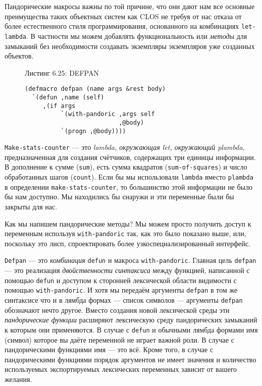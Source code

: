 Пандорические макросы важны по той причине, что они дают нам все основные преимущества таких объектных систем как CLOS не требуя от нас отказа от более естественного стиля программирования, основанного на комбинациях \verb"let-lambda". В частности мы можем добавлять функциональность или \emph{методы} для замыканий без необходимости создавать экземпляры экземпляров уже созданных объектов.

\begin{figure}Листинг 6.25: DEFPAN\label{listing_6.25}
\listbegin
\begin{verbatim}
(defmacro defpan (name args &rest body)
  `(defun ,name (self)
     ,(if args
          `(with-pandoric ,args self
                          ,@body)
          `(progn ,@body))))
\end{verbatim}
\listend
\end{figure}

\verb"Make-stats-counter" --- это \emph{lambda, окружающая let, окружающий {p\-lamb\-da}}, предназначенная для создания счётчиков, содержащих три единицы информации. В дополнение к сумме (\verb"sum"), есть сумма квадратов (\verb"sum-of-squares") и число обработанных шагов (\verb"count"). Если бы мы использовали \verb"lambda" вместо \verb"plambda" в определении \verb"make-stats-counter", то большинство этой информации не было бы нам доступно. Мы находились бы снаружи и эти переменные были бы закрыты для нас.

Как мы напишем пандорические методы? Мы можем просто получить доступ к переменным используя \verb"with-pandoric" так, как это было показано выше, или, поскольку это лисп, спроектировать более узкоспециализированный интерфейс.

\verb"Defpan" --- это \emph{комбинация} \verb"defun" и макроса \verb"with-pandoric". Главная цель \verb"defpan" --- это реализация \emph{двойственности синтаксиса} между функцией, написанной с помощью \verb"defun" и доступом к сторонней лексической области видимости с помощью \verb"with-pandoric". И хотя мы передаём аргументы \verb"defpan" в том же синтаксисе что и в лямбда формах --- список символов --- аргументы \verb"defpan" обозначают нечто другое. Вместо создания новой лексической среды эти \emph{пандорические функции} расширяют лексическую среду пандорических замыканий к которым они применяются. В случае с \verb"defun" и обычными лямбда формами имя (символ) которое вы даёте переменной не играет важной роли. В случае с пандорическими функциями имя --- это всё. Кроме того, в случае с пандорическими функциями порядок аргументов не имеет значения и количество используемых экспортируемых лексических переменных зависит от вашего желания.

